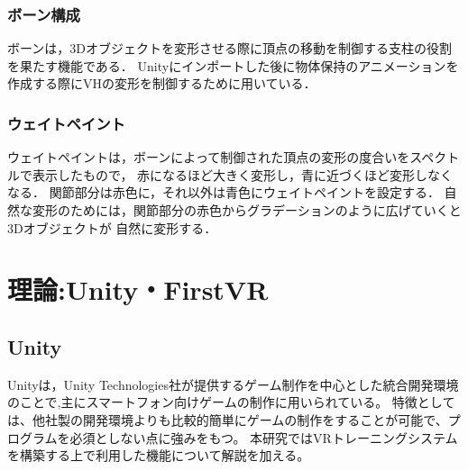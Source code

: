 \documentclass{ltjsreport}
\begin{document}
		\subsection{ボーン構成}
			ボーンは，3Dオブジェクトを変形させる際に頂点の移動を制御する支柱の役割を果たす機能である．
			Unityにインポートした後に物体保持のアニメーションを作成する際にVHの変形を制御するために用いている．

		\subsection{ウェイトペイント}
			ウェイトペイントは，ボーンによって制御された頂点の変形の度合いをスペクトルで表示したもので，
			赤になるほど大きく変形し，青に近づくほど変形しなくなる．
			関節部分は赤色に，それ以外は青色にウェイトペイントを設定する．
			自然な変形のためには，関節部分の赤色からグラデーションのように広げていくと3Dオブジェクトが
			自然に変形する．

\chapter{理論:Unity・FirstVR}
	\section{Unity}
		Unityは，Unity Technologies社が提供するゲーム制作を中心とした統合開発環境のことで,主にスマートフォン向けゲームの制作に用いられている。
		特徴としては、他社製の開発環境よりも比較的簡単にゲームの制作をすることが可能で、プログラムを必須としない点に強みをもつ。
		本研究ではVRトレーニングシステムを構築する上で利用した機能について解説を加える。
\end{document}
